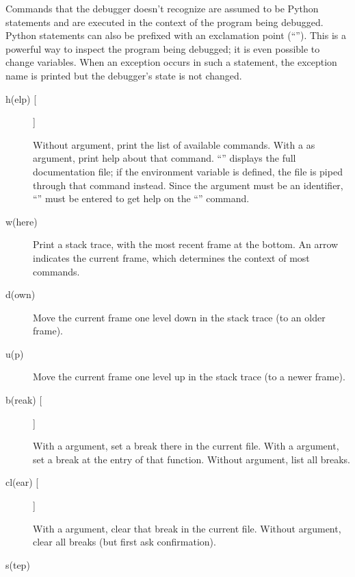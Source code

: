 Commands that the debugger doesn't recognize are assumed to be Python
statements and are executed in the context of the program being
debugged.  Python statements can also be prefixed with an exclamation
point (``\code{!}'').  This is a powerful way to inspect the program
being debugged; it is even possible to change variables.  When an
exception occurs in such a statement, the exception name is printed
but the debugger's state is not changed.

\begin{description}

\item[h(elp) []]

Without argument, print the list of available commands.
With a  as argument, print help about that command.
``'' displays the full documentation file; if the
environment variable  is defined, the file is piped
through that command instead.  Since the  argument must be
an identifier, ``'' must be entered to get help on the
``\code{!}'' command.

\item[w(here)]

Print a stack trace, with the most recent frame at the bottom.
An arrow indicates the current frame, which determines the
context of most commands.

\item[d(own)]

Move the current frame one level down in the stack trace
(to an older frame).

\item[u(p)]

Move the current frame one level up in the stack trace
(to a newer frame).

\item[b(reak) [\code{|}]]

With a  argument, set a break there in the current
file.  With a  argument, set a break at the entry of
that function.  Without argument, list all breaks.

\item[cl(ear) []]

With a  argument, clear that break in the current file.
Without argument, clear all breaks (but first ask confirmation).

\item[s(tep)]


\end{description}
